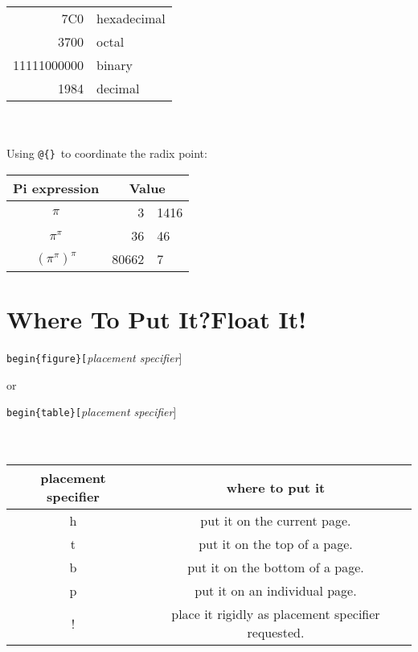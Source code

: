 \documentclass[a4paper]{report}
\begin{document}
\begin{tabular}{|r|l|}
\hline
7C0 & hexadecimal \\
3700 & octal \\ \cline{2-2}
11111000000 & binary \\
\hline \hline
1984 & decimal \\
\hline
\end{tabular}
\\\\

Using \verb|@{}|\ to coordinate the radix point:\\

\begin{tabular}{c r @{.} l}
Pi expression &
\multicolumn{2}{c}{Value} \\
\hline
$\pi$ & 3&1416 \\
$\pi^{\pi}$ & 36&46 \\
$(\pi^{\pi})^{\pi}$ & 80662&7 \\
\end{tabular}

\section{Where To Put It?Float It!}
\verb|begin{figure}[|\emph{placement specifier}]

or

\verb|begin{table}[|\emph{placement specifier}]
\\\\\\
\begin{tabular}{c @{} c}

placement specifier & where to put it\\

\hline

h & put it on the current page. \\

t & put it on the top of a page.\\

b & put it on the bottom of a page.\\

p & put it on an individual page.\\

! & place it rigidly as placement specifier requested.\\

\hline


\end{tabular}
\\\\
\end{document}
